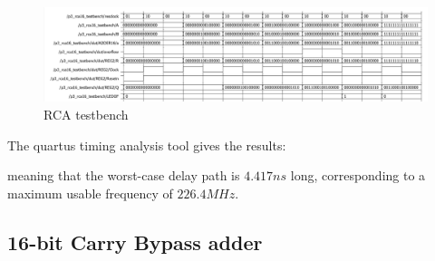 \documentclass[12pt]{article}
\begin{document}
 \begin{figure}[!h]
	\centering
	\includegraphics[scale = 0.55]{immagini/niki/testbench1.png}
	\caption{RCA testbench}       
\end{figure}
\newpage
The quartus timing analysis tool gives the results:
 \begin{figure}[!h]
 	\centering
 \begin{subfigure}{\linewidth}	
 	\centering
 \end{subfigure}

\end{figure}

meaning that the worst-case delay path is $4.417 ns $ long, corresponding to a maximum usable frequency of $226.4MHz$.

\subsection{16-bit Carry Bypass adder}
\end{document}
